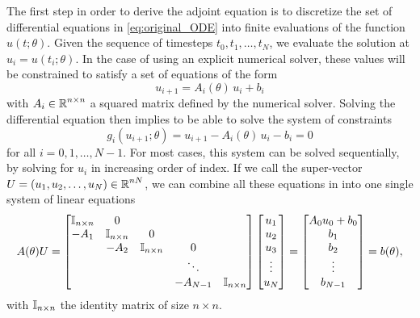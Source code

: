 The first step in order to derive the adjoint equation is to discretize the set of differential equations in \eqref{eq:original_ODE} into finite evaluations of the function $u(t; \theta)$. 
Given the sequence of timesteps $t_0, t_1, \ldots, t_N$, we evaluate the solution at $u_i = u(t_i; \theta)$. 
In the case of using an explicit numerical solver, these values will be constrained to satisfy a set of equations of the form 
\begin{equation}
    u_{i+1} = A_i (\theta) \, u_i + b_i
\end{equation}
with $A_i \in \operatorname{\mathbb{R}}^{n \times n}$ a squared matrix defined by the numerical solver. 
Solving the differential equation then implies to be able to solve the system of constraints 
\begin{equation}
    g_i (u_{i+1}; \theta) = u_{i+1} - A_i (\theta) \, u_i - b_i = 0
\end{equation}
for all $i=0, 1, \ldots, N-1$. 
For most cases, this system can be solved sequentially, by solving for $u_i$ in increasing order of index. 
If we call the super-vector $U = (u_1, u_2, \ldots, u_N) \in \operatorname{\mathbb{R}}^{nN}$, we can combine all these equations in into one single system of linear equations 
\begin{equation}
    A(\theta) U 
    = 
    \begin{bmatrix}
        \operatorname{\mathbb{I}}_{n \times n} & 0 &   &  & \\
        -A_1 & \operatorname{\mathbb{I}}_{n \times n} & 0 &  &  \\
          & -A_2 & \operatorname{\mathbb{I}}_{n \times n} & 0 &  \\
         &  &   & \ddots &   \\
         &  &  & -A_{N-1} & \operatorname{\mathbb{I}}_{n \times n}
    \end{bmatrix}
    \begin{bmatrix}
        u_1 \\
        u_2 \\
        u_3 \\
        \vdots \\
        u_N
    \end{bmatrix}
    = 
    \begin{bmatrix}
        A_0 u_0 + b_0 \\
        b_1 \\
        b_2 \\
        \vdots \\
        b_{N-1}
    \end{bmatrix}
    = 
    b(\theta), 
\end{equation}
with $\operatorname{\mathbb{I}}_{n \times n}$ the identity matrix of size $n \times n$.
